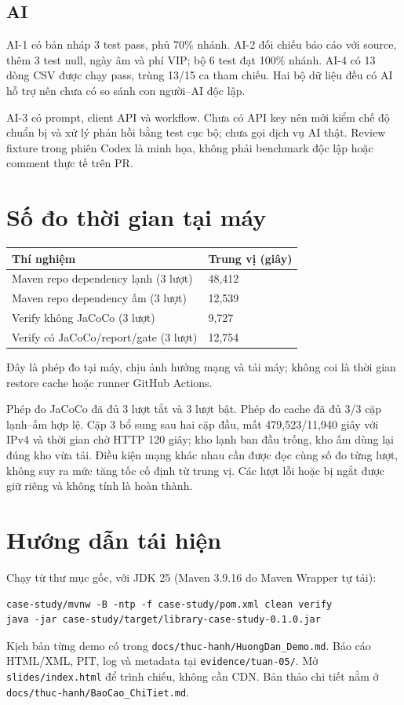 \documentclass[12pt,a4paper]{article}
\begin{document}
\subsection{AI}
AI-1 có bản nháp 3 test pass, phủ 70\% nhánh. AI-2 đối chiếu báo cáo với source, thêm 3 test null, ngày âm và phí VIP; bộ 6 test đạt 100\% nhánh. AI-4 có 13 dòng CSV được chạy pass, trùng 13/15 ca tham chiếu. Hai bộ dữ liệu đều có AI hỗ trợ nên chưa có so sánh con người--AI độc lập.

AI-3 có prompt, client API và workflow. Chưa có API key nên mới kiểm chế độ chuẩn bị và xử lý phản hồi bằng test cục bộ; chưa gọi dịch vụ AI thật. Review fixture trong phiên Codex là minh họa, không phải benchmark độc lập hoặc comment thực tế trên PR.

\section{Số đo thời gian tại máy}
\begin{longtable}{p{8cm}p{4cm}}
\toprule
Thí nghiệm & Trung vị (giây) \\
\midrule
Maven repo dependency lạnh (3 lượt) & 48,412 \\
Maven repo dependency ấm (3 lượt) & 12,539 \\
Verify không JaCoCo (3 lượt) & 9,727 \\
Verify có JaCoCo/report/gate (3 lượt) & 12,754 \\
\bottomrule
\end{longtable}
Đây là phép đo tại máy, chịu ảnh hưởng mạng và tải máy; không coi là thời gian restore cache hoặc runner GitHub Actions.

Phép đo JaCoCo đã đủ 3 lượt tắt và 3 lượt bật. Phép đo cache đã đủ 3/3 cặp lạnh--ấm hợp lệ. Cặp 3 bổ sung sau hai cặp đầu, mất 479,523/11,940 giây với IPv4 và thời gian chờ HTTP 120 giây; kho lạnh ban đầu trống, kho ấm dùng lại đúng kho vừa tải. Điều kiện mạng khác nhau cần được đọc cùng số đo từng lượt, không suy ra mức tăng tốc cố định từ trung vị. Các lượt lỗi hoặc bị ngắt được giữ riêng và không tính là hoàn thành.

\section{Hướng dẫn tái hiện}
Chạy từ thư mục gốc, với JDK 25 (Maven 3.9.16 do Maven Wrapper tự tải):
\begin{verbatim}
case-study/mvnw -B -ntp -f case-study/pom.xml clean verify
java -jar case-study/target/library-case-study-0.1.0.jar
\end{verbatim}
Kịch bản từng demo có trong \texttt{docs/thuc-hanh/HuongDan\_Demo.md}. Báo cáo HTML/XML, PIT, log và metadata tại \texttt{evidence/tuan-05/}. Mở \texttt{slides/index.html} để trình chiếu, không cần CDN. Bản thảo chi tiết nằm ở \texttt{docs/thuc-hanh/BaoCao\_ChiTiet.md}.
\end{document}

